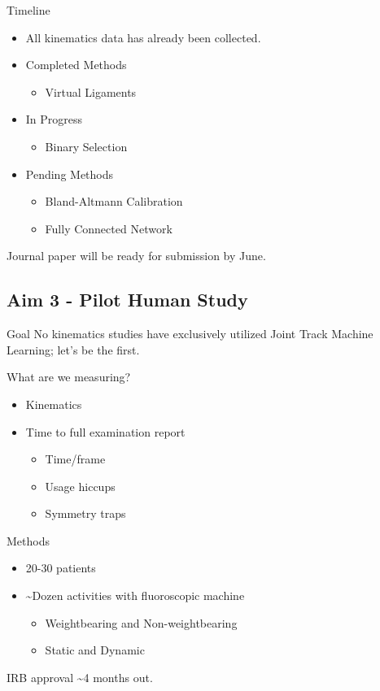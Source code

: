 \documentclass[presentation, aspectratio=1610]{beamer}
\begin{document}
\begin{frame}[label={sec:org3cb69ba}]{Timeline}
\begin{itemize}
\item All kinematics data has already been collected.
\item Completed Methods
\begin{itemize}
\item Virtual Ligaments
\end{itemize}
\item In Progress
\begin{itemize}
\item Binary Selection
\end{itemize}
\item Pending Methods
\begin{itemize}
\item Bland-Altmann Calibration
\item Fully Connected Network
\end{itemize}
\end{itemize}

Journal paper will be ready for submission by June.
\end{frame}
\subsection{Aim 3 - Pilot Human Study}
\label{sec:org429eef6}
\begin{frame}[label={sec:org6704d37}]{Goal}
No kinematics studies have exclusively utilized Joint Track Machine Learning; let's be the first.

What are we measuring?
\begin{itemize}
\item Kinematics
\item Time to full examination report
\begin{itemize}
\item Time/frame
\item Usage hiccups
\item Symmetry traps
\end{itemize}
\end{itemize}
\end{frame}
\begin{frame}[label={sec:org1103abb}]{Methods}
\begin{itemize}
\item 20-30 patients
\item \textasciitilde{}Dozen activities with fluoroscopic machine
\begin{itemize}
\item Weightbearing and Non-weightbearing
\item Static and Dynamic
\end{itemize}
\end{itemize}

IRB approval \textasciitilde{}4 months out.
\end{frame}
\end{document}
